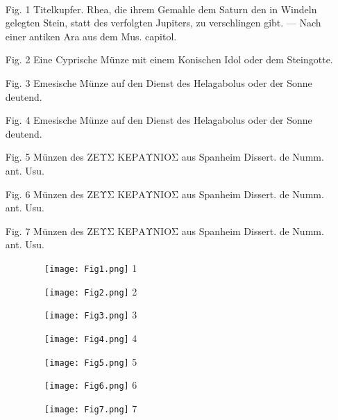\documentclass[a4paper, 11pt, oneside, polutonikogreek, german]{article}
\begin{document}
\paragraph{}
\begin{enumerate}
    \item[Fig. 1] Titelkupfer. Rhea, die ihrem Gemahle dem Saturn den in Windeln gelegten Stein, statt des verfolgten Jupiters, zu verschlingen gibt. --- Nach einer antiken Ara aus dem Mus. capitol.
    \item[Fig. 2] Eine Cyprische Münze mit einem Konischen Idol oder dem Steingotte.
    \item[Fig. 3] Emesische Münze auf den Dienst des Helagabolus oder der Sonne deutend.
    \item[Fig. 4] Emesische Münze auf den Dienst des Helagabolus oder der Sonne deutend.
    \item[Fig. 5] Münzen des ΖΕΥΣ ΚΕΡΑΥNIOΣ aus Spanheim Dissert. de Numm. ant. Usu.
    \item[Fig. 6] Münzen des ΖΕΥΣ ΚΕΡΑΥNIOΣ aus Spanheim Dissert. de Numm. ant. Usu.
    \item[Fig. 7] Münzen des ΖΕΥΣ ΚΕΡΑΥNIOΣ aus Spanheim Dissert. de Numm. ant. Usu.
\end{enumerate}
\clearpage
\pagestyle{fancy}
\fancyhf{}
\rhead{}
\cfoot{\thepage}

\begin{figure}[ht]

\begin{subfigure}{0.5\textwidth}
\texttt{[image: Fig1.png]} 1
\end{subfigure}
\begin{subfigure}{0.5\textwidth}
\texttt{[image: Fig2.png]} 2
\end{subfigure}
\begin{subfigure}{0.5\textwidth}
\texttt{[image: Fig3.png]} 3
\end{subfigure}
\begin{subfigure}{0.5\textwidth}
\texttt{[image: Fig4.png]} 4
\end{subfigure}
\begin{subfigure}{0.5\textwidth}
\texttt{[image: Fig5.png]} 5
\end{subfigure}
\begin{subfigure}{0.5\textwidth}
\texttt{[image: Fig6.png]} 6
\end{subfigure}
\begin{subfigure}{0.5\textwidth}
\texttt{[image: Fig7.png]} 7
\end{subfigure}

\end{figure}
\clearpage
\end{document}
